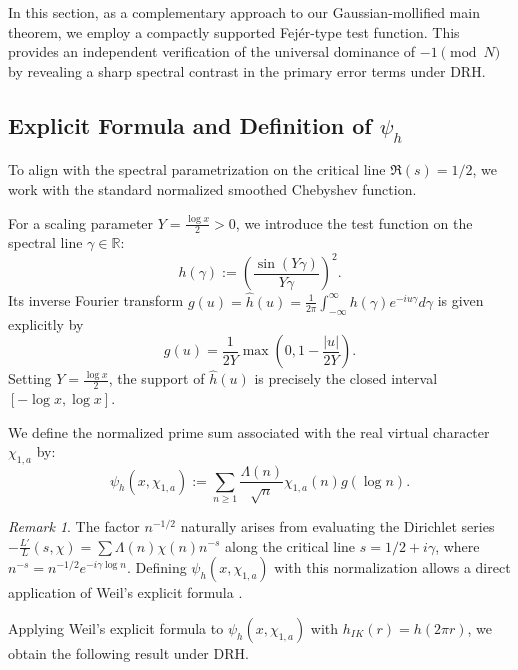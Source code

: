 \documentclass[12pt,reqno]{amsart}
\theoremstyle{definition}
\theoremstyle{remark}
\newtheorem{remark}[theorem]{Remark}
\numberwithin{equation}{section}
\begin{document}
In this section, as a complementary approach to our Gaussian-mollified main theorem, we employ a compactly supported Fej\'er-type test function. This provides an independent verification of the universal dominance of $-1 \pmod N$ by revealing a sharp spectral contrast in the primary error terms under DRH.

\subsection{Explicit Formula and Definition of $\psi_h$}

To align with the spectral parametrization on the critical line $\mathfrak{R}(s) = 1/2$, we work with the standard normalized smoothed Chebyshev function. 

For a scaling parameter $Y = \frac{\log x}{2} > 0$, we introduce the test function on the spectral line $\gamma \in \mathbb{R}$:
\[
h(\gamma) := \left( \frac{\sin(Y\gamma)}{Y\gamma} \right)^2.
\]
Its inverse Fourier transform $g(u)=\hat{h}(u) = \frac{1}{2\pi} \int_{-\infty}^{\infty} h(\gamma) e^{-i u \gamma} d\gamma$ is given explicitly by
\[
g(u)= \frac{1}{2Y} \max\left(0, 1 - \frac{|u|}{2Y}\right).
\]
Setting $Y = \frac{\log x}{2}$, the support of $\hat{h}(u)$ is precisely the closed interval $[-\log x, \log x]$. 

We define the normalized prime sum associated with the real virtual character $\chi_{1,a}$ by:
\[
\psi_h(x, \chi_{1,a}) := \sum_{n \ge 1} \frac{\Lambda(n)}{\sqrt{n}} \chi_{1,a}(n) g(\log n).
\]
\begin{remark}
The factor $n^{-1/2}$ naturally arises from evaluating the Dirichlet series $-\frac{L'}{L}(s, \chi) = \sum \Lambda(n)\chi(n)n^{-s}$ along the critical line $s = 1/2 + i\gamma$, where $n^{-s} = n^{-1/2} e^{-i\gamma \log n}$. Defining $\psi_h(x, \chi_{1,a})$ with this normalization allows a direct application of Weil's explicit formula \cite[Theorem 5.12]{IK}.
\end{remark}

Applying Weil's explicit formula \cite[Theorem 5.12]{IK} to $\psi_h(x, \chi_{1,a})$ with $h_{IK}(r) = h(2\pi r)$, we obtain the following result under DRH.
\end{document}
